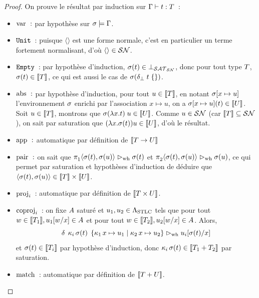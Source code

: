 \begin{proof}
  On prouve le résultat par induction sur $\Gamma\mathrel{\vdash} t : T$~:
  \begin{itemize}
  \item $\mathrm{var}~:$ par hypothèse sur $\sigma\models\Gamma$.
  \item ${\normalfont\texttt{Unit}}$~: puisque $\langle\rangle$ est une forme normale, c'est en
    particulier un terme fortement normalisant, d'où
    $\langle\rangle \in \mathcal{SN}$.
  \item ${\normalfont\texttt{Empty}}$~: par hypothèse d'induction,
    $\sigma(t) \in \bot_{\mathcal{SAT}_{\mathcal{SN}}}$, donc pour tout type $T$,
    $\sigma(t) \in \llbracket T\rrbracket$, ce qui est aussi le cas de
    $\sigma(\delta_{\bot}\;t\;\{\})$.
  \item $\mathrm{abs}~:$ par hypothèse d'induction,
    pour tout $u \in \llbracket T\rrbracket$, en notant $\sigma[x\mapsto u]$
    l'environnement $\sigma$ enrichi par l'association $x\mapsto u$,
    on a $\sigma[x\mapsto u](t) \in \llbracket U\rrbracket$. Soit
    $u \in \llbracket T\rrbracket$, montrons que
    $\sigma(\lambda x.t)\;u \in \llbracket U\rrbracket$.
    Comme $u \in \mathcal{SN}$ (car $\llbracket T\rrbracket\subseteq \mathcal{SN}$), on sait par
    saturation que $(\lambda x.\sigma(t))u \in \llbracket U\rrbracket$,
    d'où le résultat.
  \item $\mathrm{app}~:$ automatique par définition de
    $\llbracket T\to U\rrbracket$
  \item $\mathrm{pair}~:$ on sait que
    $\mathop{\pi_{1}^{}}\langle \sigma(t),\sigma(u)\rangle \mathrel{\rhd_{\mathrm{wh}}} \sigma(t)$
    et
    $\mathop{\pi_{2}^{}}\langle \sigma(t),\sigma(u)\rangle\mathrel{\rhd_{\mathrm{wh}}} \sigma(u)$,
    ce qui permet par saturation et hypothèses d'induction de déduire que
    $\langle \sigma(t),\sigma(u)\rangle \in
    \llbracket T\rrbracket \times \llbracket U\rrbracket$.
  \item $\mathrm{proj}_{i}$~: automatique par définition de
    $\llbracket T\times U\rrbracket$.
  \item $\mathrm{coproj}_{i}$~: on fixe $A$ saturé et $u_1,u_2 \in \Lambda_{\mathrm{STLC}}$
    tels que pour tout $w \in \llbracket T_1\rrbracket, u_1[w/x]\in A$ et
    pour tout $w\in\llbracket T_2\rrbracket, u_2[w/x]\in A$. Alors,
    \[\delta\;\mathop{\kappa_{i}}\sigma(t)\;\left\{\mathop{\kappa_{1}} x\mapsto u_1 \;\middle\vert\; \mathop{\kappa_{2}} x\mapsto u_2\right\} \mathrel{\rhd_{\mathrm{wh}}} u_i[\sigma(t)/x]\]
    et $\sigma(t) \in \llbracket T_i\rrbracket$ par hypothèse d'induction,
    donc $\mathop{\kappa_{i}}\sigma(t) \in \llbracket T_1+T_2\rrbracket$ par
    saturation.
  \item $\mathrm{match}$~: automatique par définition de $\llbracket T+U\rrbracket$.
    \qedhere
  \end{itemize}
\end{proof}

